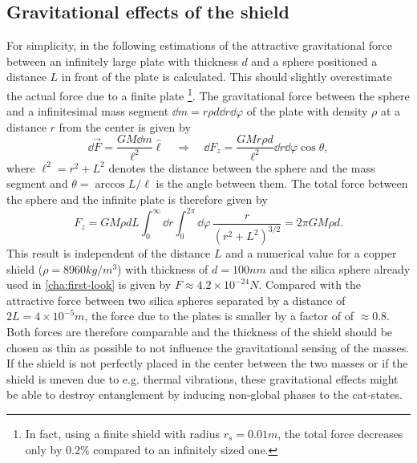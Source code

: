 \subsection{Gravitational effects of the shield}
For simplicity, in the following estimations of the attractive gravitational force between an infinitely large plate with thickness $d$ and a sphere positioned a distance $L$ in front of the plate is calculated. This should slightly overestimate the actual force due to a finite plate \footnote{In fact, using a finite shield with radius $r_s = 0.01\si{m}$, the total force decreases only by $0.2\%$ compared to an infinitely sized one.}.
The gravitational force between the sphere and a infinitesimal mass segment $\dd m = r \rho d \dd r\dd \varphi$ of the plate with density $\rho$ at a distance $r$ from the center is given by
\begin{equation}
  \dd \vec{F} = \frac{G M \dd m}{\ell^2} \boldsymbol{\hat{\ell}} 
  \quad \Rightarrow \quad
  \dd F_z = \frac{G M r \rho d}{\ell^2} \dd r \dd \varphi \cos \theta,
\end{equation}
where $\ell^2 = r^2 + L^2$ denotes the distance between the sphere and the mass segment and $\theta = \arccos L/\ell$ is the angle between them. %
The total force between the sphere and the infinite plate is therefore given by
\begin{equation}
  F_z = GM \rho d L \int_{0}^{\infty} \dd r \int_{0}^{2\pi} \dd \varphi \, \frac{r}{(r^2 + L^2)^{3/2}} = 2 \pi G M \rho d .
\end{equation}
This result is independent of the distance $L$ and a numerical value for a copper shield ($\rho = 8960\si{kg/m^3}$) with thickness of $d = 100\si{nm}$ and the silica sphere already used in \cref{cha:first-look} is given by $F \approx 4.2 \times 10^{-24}\si{N}$.
Compared with the attractive force between two silica spheres separated by a distance of $2L = 4\times 10^{-5}\si{m}$, the force due to the plates is smaller by a factor of of $\approx 0.8$.
Both forces are therefore comparable and the thickness of the shield should be chosen as thin as possible to not influence the gravitational sensing of the masses. 
If the shield is not perfectly placed in the center between the two masses or if the shield is uneven due to e.g. thermal vibrations, these gravitational effects might be able to destroy entanglement by inducing non-global phases to the cat-states.